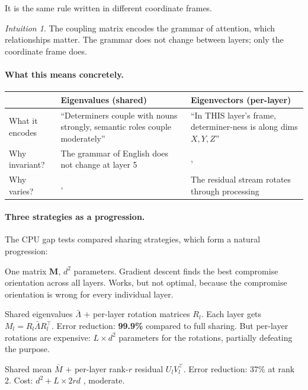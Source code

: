 \documentclass[11pt, a4paper]{article}
\newcommand{\M}{\mathbf{M}}
\theoremstyle{remark}
\newtheorem*{intuition}{Intuition}
\begin{document}
It is the same rule written in different coordinate frames.

\begin{intuition}
The coupling matrix encodes the grammar of attention, which relationships matter.
The grammar does not change between layers; only the coordinate frame does.
\end{intuition}

\paragraph{What this means concretely.}

\begin{center}\small
\renewcommand{\arraystretch}{1.3}
\begin{tabular}{@{}p{3cm}p{5cm}p{5cm}@{}}
\toprule
& \textbf{Eigenvalues (shared)} & \textbf{Eigenvectors (per-layer)} \\
\midrule
What it encodes & ``Determiners couple with nouns strongly, semantic roles couple moderately'' & ``In THIS layer's frame, determiner-ness is along dims $X, Y, Z$'' \\
Why invariant? & The grammar of English does not change at layer 5 & ,  \\
Why varies? & ,  & The residual stream rotates through processing \\
\bottomrule
\end{tabular}
\end{center}

\paragraph{Three strategies as a progression.}
The CPU gap tests compared sharing strategies, which form a natural progression:

\begin{description}[nosep]
    \item[Full sharing (current ORN):] One matrix $\M$, $d^2$ parameters.
    Gradient descent finds the best compromise orientation across all layers.
    Works, but not optimal, because the compromise orientation is wrong for every individual layer.

    \item[Spectral sharing:] Shared eigenvalues $\bar{\Lambda}$ $+$ per-layer rotation matrices $R_l$.
    Each layer gets $M_l = R_l \bar{\Lambda} R_l^\top$.
    Error reduction: \textbf{99.9\%} compared to full sharing.
    But per-layer rotations are expensive: $L \times d^2$ parameters for the rotations, partially defeating the purpose.

    \item[Low-rank corrections:] Shared mean $\bar{M}$ $+$ per-layer rank-$r$ residual $U_l V_l^\top$.
    Error reduction: 37\% at rank 2.
    Cost: $d^2 + L \times 2rd$ ,  moderate.
\end{description}
\end{document}
